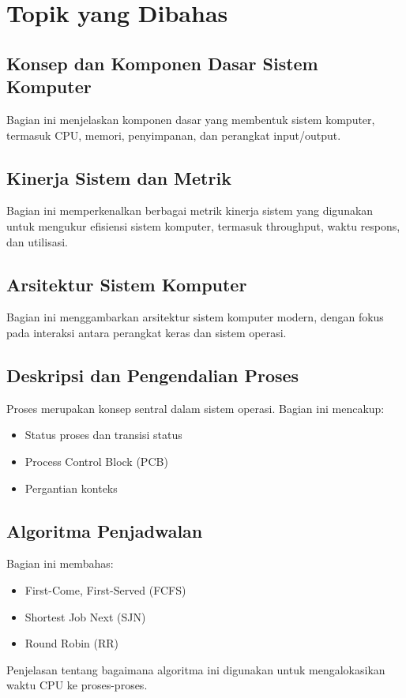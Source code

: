 \documentclass{article}
\begin{document}
\section{Topik yang Dibahas}

\subsection{Konsep dan Komponen Dasar Sistem Komputer}
Bagian ini menjelaskan komponen dasar yang membentuk sistem komputer, termasuk CPU, memori, penyimpanan, dan perangkat input/output.

\subsection{Kinerja Sistem dan Metrik}
Bagian ini memperkenalkan berbagai metrik kinerja sistem yang digunakan untuk mengukur efisiensi sistem komputer, termasuk throughput, waktu respons, dan utilisasi.

\subsection{Arsitektur Sistem Komputer}
Bagian ini menggambarkan arsitektur sistem komputer modern, dengan fokus pada interaksi antara perangkat keras dan sistem operasi.

\subsection{Deskripsi dan Pengendalian Proses}
Proses merupakan konsep sentral dalam sistem operasi. Bagian ini mencakup:
\begin{itemize}
    \item Status proses dan transisi status
    \item Process Control Block (PCB)
    \item Pergantian konteks
\end{itemize}

\subsection{Algoritma Penjadwalan}
Bagian ini membahas:
\begin{itemize}
    \item First-Come, First-Served (FCFS)
    \item Shortest Job Next (SJN)
    \item Round Robin (RR)
\end{itemize}
Penjelasan tentang bagaimana algoritma ini digunakan untuk mengalokasikan waktu CPU ke proses-proses.
\end{document}
